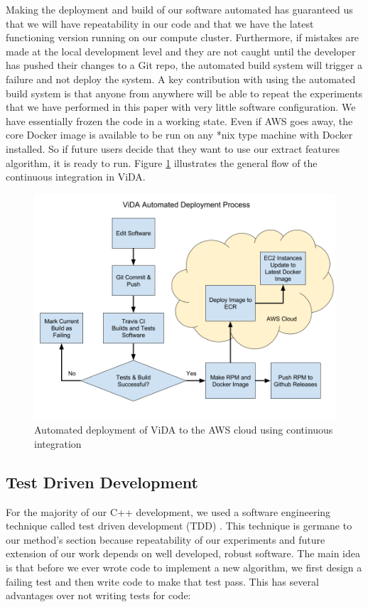 Making the deployment and build of our software automated has guaranteed us
that we will have repeatability in our code and that we have the latest
functioning version running on our compute cluster. Furthermore, if mistakes are
made at the local development level and they are not caught until the developer
has pushed their changes to a Git repo, the automated build system will trigger
a failure and not deploy the system. A key contribution with using the automated
build system is that anyone from anywhere will be able to repeat the experiments
that we have performed in this paper with very little software configuration. We
have essentially frozen the code in a working state. Even if AWS goes away, the
core Docker image is available to be run on any *nix type machine with Docker installed.
So if future users decide that they want to use our extract features algorithm,
it is ready to run. Figure \ref{fig:continuous_integration} illustrates the
general flow of the continuous integration in ViDA.

\begin{figure}[h]
  \label{fig:continuous_integration}
  \centering
  \includegraphics[width=\textwidth]{figures/continuous_integration}
  \caption{Automated deployment of ViDA to the AWS cloud using continuous integration}
\end{figure}

\subsection{\label{subsection:tdd}Test Driven Development}
For the majority of our C++ development, we used a software engineering technique
called test driven development (TDD) \cite{beck2003test}. This technique is germane to
our method's section because repeatability of our experiments and future
extension of our work depends on well developed, robust software. The main idea is that
before we ever wrote code to implement a new algorithm, we first design a failing
test and then write code to make that test pass. This has several advantages over
not writing tests for code:

